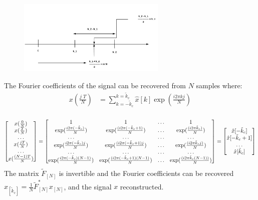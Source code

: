 \documentclass[12pt,twoside]{article}
\begin{document}
\begin{enumerate}
\begin{enumerate}
 	\begin{figure}[H]
		\centering
		\captionsetup{justification=centering}
		\includegraphics[width=200pt]{Q3_c.png}
	\end{figure}

 

The Fourier coefficients of the signal can be recovered from $N$ samples where:
 \begin{align*}
 	x(\frac{j\; T}{N})	&= \sum_{k=-\tilde{k}_c}^{k=\tilde{k}_c}  \hat{x}[k]  \exp (\frac{i 2 \pi k j} {N}) \\
 \end{align*}
 
    $$
  \begin{bmatrix} x(\frac{0}{N}) \\ x(\frac{T}{N}) \\ \ldots \\ x(\frac{jT}{N}) \\ \ldots\\ x(\frac{(N-1)T}{N})  \end{bmatrix} 
  	= \begin{bmatrix} 1  & 1 & \ldots  & 1 \\
	 \exp (\frac{i 2 \pi (-\tilde{k}_c)} {N} ) & \exp (\frac{(i 2 \pi (-\tilde{k}_c+ 1)} {N} ) & \ldots &  \exp (\frac{(i 2 \pi \tilde{k}_c)} {N} ) \\
	 \ldots &  \ldots & \ldots & \ldots \\   
	 \exp (\frac{i 2 \pi (-\tilde{k}_c) j} {N} ) & \exp (\frac{(i 2 \pi (-\tilde{k}_c+ 1) j} {N} ) & \ldots &  \exp (\frac{(i 2 \pi \tilde{k}_c j)} {N} ) \\
	 \ldots &  \ldots & \ldots & \ldots \\   
	 \exp (\frac{i 2 \pi (-\tilde{k}_c) (N-1)} {N} ) & \exp (\frac{(i 2 \pi (-\tilde{k}_c+ 1) (N-1)} {N} ) & \ldots &  \exp (\frac{(i 2 \pi \tilde{k}_c (N-1))} {N} )  \end{bmatrix}
	 = \begin{bmatrix} \hat{x}[-\tilde{k}_c]  \\ \hat{x}[-\tilde{k}_c + 1] \\ \ldots \\ \hat{x}[\tilde{k}_c] \end{bmatrix}
$$
The matrix $\tilde{F}_{[N]}$ is invertible and the Fourier coefficients can be recovered $\hat{x}_{[\tilde{k}_c]} = \frac{1}{N} \tilde{F}^*_{[N]} x_{[N]}$, and the signal $x$ reconstructed. 
\end{enumerate} 
 

\end{enumerate}
\end{document}
